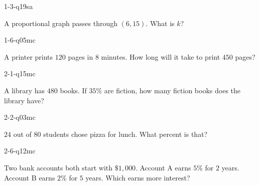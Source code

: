 
\begin{practiceQuestion}{1-3-q19}{sa}
\begin{questionText}
A proportional graph passes through $(6, 15)$. What is $k$?
\end{questionText}
\end{practiceQuestion}

\begin{practiceQuestion}{1-6-q05}{mc}
\begin{questionText}
A printer prints $120$ pages in $8$ minutes. How long will it take to print $450$ pages?
\end{questionText}
\end{practiceQuestion}

\begin{practiceQuestion}{2-1-q15}{mc}
\begin{questionText}
A library has $480$ books. If $35\%$ are fiction, how many fiction books does the library have?
\end{questionText}
\end{practiceQuestion}

\begin{practiceQuestion}{2-2-q03}{mc}
\begin{questionText}
$24$ out of $80$ students chose pizza for lunch. What percent is that?
\end{questionText}
\end{practiceQuestion}

\begin{practiceQuestion}{2-6-q12}{mc}
\begin{questionText}
Two bank accounts both start with $\$1{,}000$. Account A earns $5\%$ for $2$ years. Account B earns $2\%$ for $5$ years. Which earns more interest?
\end{questionText}
\end{practiceQuestion}

